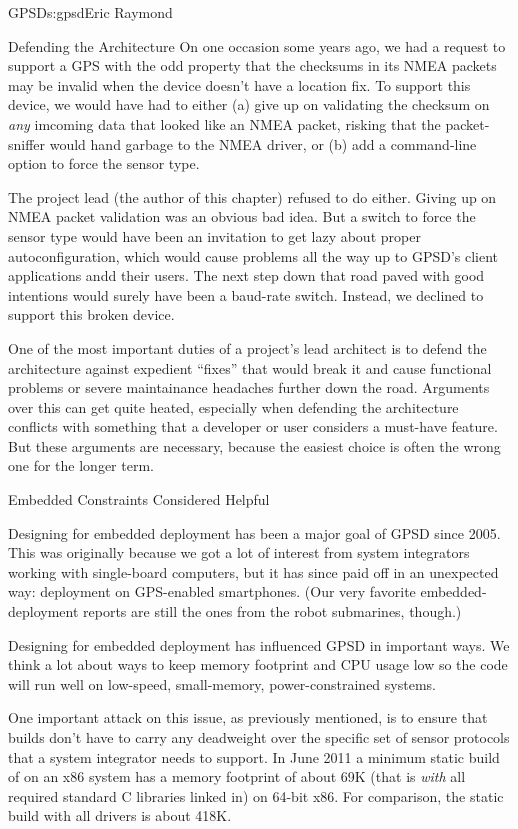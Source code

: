 \begin{aosachapter}{GPSD}{s:gpsd}{Eric Raymond}
\begin{aosasect1}{Defending the Architecture}
On one occasion some years ago, we had a request to support a GPS with
the odd property that the checksums in its NMEA packets may be invalid
when the device doesn't have a location fix.  To support this device,
we would have had to either (a) give up on validating the checksum on
\emph{any} imcoming data that looked like an NMEA packet, risking that
the packet-sniffer would hand garbage to the NMEA driver, or (b) add a
command-line option to force the sensor type.

The project lead (the author of this chapter) refused to do either.
Giving up on NMEA packet validation was an obvious bad idea.  But a
switch to force the sensor type would have been an invitation to get
lazy about proper autoconfiguration, which would cause problems all
the way up to GPSD's client applications andd their users.  The next
step down that road paved with good intentions would surely have been
a baud-rate switch. Instead, we declined to support this broken device.

One of the most important duties of a project's lead architect is to
defend the architecture against expedient ``fixes'' that would break
it and cause functional problems or severe maintainance headaches
further down the road.  Arguments over this can get quite heated,
especially when defending the architecture conflicts with something
that a developer or user considers a must-have feature.  But these
arguments are necessary, because the easiest choice is often the wrong
one for the longer term.

\end{aosasect1}

\begin{aosasect1}{Embedded Constraints Considered Helpful}

Designing for embedded deployment has been a major goal of GPSD since
2005. This was originally because we got a lot of interest from system
integrators working with single-board computers, but it has since paid
off in an unexpected way: deployment on GPS-enabled smartphones. (Our
very favorite embedded-deployment reports are still the ones from the
robot submarines, though.)

Designing for embedded deployment has influenced GPSD in important
ways.  We think a lot about ways to keep memory footprint and CPU
usage low so the code will run well on low-speed, small-memory,
power-constrained systems.

One important attack on this issue, as previously mentioned, is to
ensure that  builds don't have to carry any deadweight over
the specific set of sensor protocols that a system integrator needs to
support. In June 2011 a minimum static build of  on an x86
system has a memory footprint of about 69K (that is \emph{with} all
required standard C libraries linked in) on 64-bit x86. For
comparison, the static build with all drivers is about 418K.


\end{aosasect1}
\end{aosachapter}
